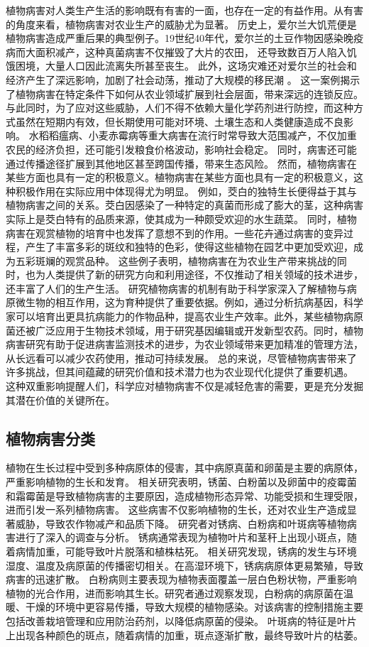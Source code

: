 \documentclass[AutoFakeBold]{LZUThesis-PgD&PhD}
\begin{document}
	
	植物病害对人类生产生活的影响既有有害的一面，也存在一定的有益作用。从有害的角度来看，植物病害对农业生产的威胁尤为显著。
	历史上，爱尔兰大饥荒便是植物病害造成严重后果的典型例子。19世纪40年代，爱尔兰的土豆作物因感染晚疫病而大面积减产，这种真菌病害不仅摧毁了大片的农田，
	还导致数百万人陷入饥饿困境，大量人口因此流离失所甚至丧生。
	此外，这场灾难还对爱尔兰的社会和经济产生了深远影响，加剧了社会动荡，推动了大规模的移民潮 \cite{ograda2009great}。
	这一案例揭示了植物病害在特定条件下如何从农业领域扩展到社会层面，带来深远的连锁反应。
	与此同时，为了应对这些威胁，人们不得不依赖大量化学药剂进行防控，而这种方式虽然在短期内有效，但长期使用可能对环境、土壤生态和人类健康造成不良影响。
	水稻稻瘟病、小麦赤霉病等重大病害在流行时常导致大范围减产，不仅加重农民的经济负担，还可能引发粮食价格波动，影响社会稳定。
	同时，病害还可能通过传播途径扩展到其他地区甚至跨国传播，带来生态风险。
	然而，植物病害在某些方面也具有一定的积极意义。植物病害在某些方面也具有一定的积极意义，这种积极作用在实际应用中体现得尤为明显。
	例如，茭白的独特生长便得益于其与植物病害之间的关系。茭白因感染了一种特定的真菌而形成了膨大的茎，这种病害实际上是茭白特有的品质来源，使其成为一种颇受欢迎的水生蔬菜。
	同时，植物病害在观赏植物的培育中也发挥了意想不到的作用。一些花卉通过病害的变异过程，产生了丰富多彩的斑纹和独特的色彩，使得这些植物在园艺中更加受欢迎，成为五彩斑斓的观赏品种。
	这些例子表明，植物病害在为农业生产带来挑战的同时，也为人类提供了新的研究方向和利用途径，不仅推动了相关领域的技术进步，还丰富了人们的生产生活。
	研究植物病害的机制有助于科学家深入了解植物与病原微生物的相互作用，这为育种提供了重要依据。例如，通过分析抗病基因，科学家可以培育出更具抗病能力的作物品种，提高农业生产效率。此外，某些植物病原菌还被广泛应用于生物技术领域，用于研究基因编辑或开发新型农药。同时，植物病害研究有助于促进病害监测技术的进步，为农业领域带来更加精准的管理方法，从长远看可以减少农药使用，推动可持续发展。
	总的来说，尽管植物病害带来了许多挑战，但其间蕴藏的研究价值和技术潜力也为农业现代化提供了重要机遇。
	这种双重影响提醒人们，科学应对植物病害不仅是减轻危害的需要，更是充分发掘其潜在价值的关键所在。
	
	
	
	\subsection{植物病害分类}
	
	植物在生长过程中受到多种病原体的侵害，其中病原真菌和卵菌是主要的病原体，严重影响植物的生长和发育。
	相关研究表明，锈菌、白粉菌以及卵菌中的疫霉菌和霜霉菌是导致植物病害的主要原因，造成植物形态异常、功能受损和生理受限，进而引发一系列植物病害。
	这些病害不仅影响植物的生长，还对农业生产造成显著威胁，导致农作物减产和品质下降。
	研究者对锈病、白粉病和叶斑病等植物病害进行了深入的调查与分析。
	锈病通常表现为植物叶片和茎秆上出现小斑点，随着病情加重，可能导致叶片脱落和植株枯死。
	相关研究发现，锈病的发生与环境湿度、温度及病原菌的传播密切相关。在高湿环境下，锈病病原体更易繁殖，导致病害的迅速扩散。
	白粉病则主要表现为植物表面覆盖一层白色粉状物，严重影响植物的光合作用，进而影响其生长。研究者通过观察发现，白粉病的病原菌在温暖、干燥的环境中更容易传播，导致大规模的植物感染。对该病害的控制措施主要包括改善栽培管理和应用防治药剂，以降低病原菌的侵染。
	叶斑病的特征是叶片上出现各种颜色的斑点，随着病情的加重，斑点逐渐扩散，最终导致叶片的枯萎。
	
\end{document}
